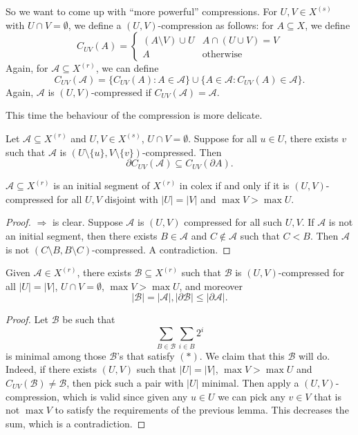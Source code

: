 \documentclass[a4paper]{article}
\begin{document}
So we want to come up with ``more powerful'' compressions. For $U, V \in X^{(s)}$ with $U \cap V = \emptyset$, we define a $(U, V)$-compression as follows: for $A \subseteq X$, we define
\[
  C_{UV}(A) =
  \begin{cases}
    (A \setminus V) \cup U & A \cap (U \cup V) = V\\
    A & \text{otherwise}
  \end{cases}
\]
Again, for $\mathcal{A} \subseteq X^{(r)}$, we can define
\[
  C_{UV}(\mathcal{A}) = \{C_{UV}(A) : A \in \mathcal{A}\} \cup \{A \in \mathcal{A}: C_{UV}(A) \in \mathcal{A}\}.
\]
Again, $\mathcal{A}$ is $(U, V)$-compressed if $C_{UV}(\mathcal{A}) = \mathcal{A}$.

This time the behaviour of the compression is more delicate.
\begin{lemma}
  Let $\mathcal{A} \subseteq X^{(r)}$ and $U, V \in X^{(s)}$, $U \cap V = \emptyset$. Suppose for all $u \in U$, there exists $v$ such that $\mathcal{A}$ is $(U \setminus \{u\}, V \setminus \{v\})$-compressed. Then
  \[
    \partial C_{UV} (\mathcal{A}) \subseteq C_{UV}(\partial A).\tag*{$\square$}
  \]
\end{lemma}

\begin{lemma}
  $\mathcal{A} \subseteq X^{(r)}$ is an initial segment of $X^{(r)}$ in colex if and only if it is $(U, V)$-compressed for all $U, V$ disjoint with $|U| = |V|$ and $\max V > \max U$.
\end{lemma}

\begin{proof}
  $\Rightarrow$ is clear. Suppose $\mathcal{A}$ is $(U, V)$ compressed for all such $U, V$. If $\mathcal{A}$ is not an initial segment, then there exists $B \in \mathcal{A}$ and $C \not \in \mathcal{A}$ such that $C < B$. Then $\mathcal{A}$ is not $(C \setminus B, B \setminus C)$-compressed. A contradiction.
\end{proof}

\begin{lemma}
  Given $\mathcal{A} \in X^{(r)}$, there exists $\mathcal{B} \subseteq X^{(r)}$ such that $\mathcal{B}$ is $(U, V)$-compressed for all $|U| = |V|$, $U \cap V= \emptyset$, $\max V > \max U$, and moreover
  \[
    |\mathcal{B}| = |\mathcal{A}|, |\partial \mathcal{B}| \leq |\partial \mathcal{A}|.\tag{$*$}
  \]
\end{lemma}

\begin{proof}
  Let $\mathcal{B}$ be such that
  \[
    \sum_{B \in \mathcal{B}} \sum_{i \in B} 2^i
  \]
  is minimal among those $\mathcal{B}$'s that satisfy $(*)$. We claim that this $\mathcal{B}$ will do. Indeed, if there exists $(U, V)$ such that $|U| = |V|$, $\max V > \max U$ and $C_{UV}(\mathcal{B}) \not= \mathcal{B}$, then pick such a pair with $|U|$ minimal. Then apply a $(U, V)$-compression, which is valid since given any $u \in U$ we can pick any $v \in V$ that is not $\max V$ to satisfy the requirements of the previous lemma. This decreases the sum, which is a contradiction.
\end{proof}
\end{document}
